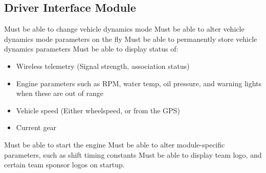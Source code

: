 \subsection{Driver Interface Module}
Must be able to change vehicle dynamics mode
Must be able to alter vehicle dynamics mode parameters on the fly
Must be able to permanently store vehicle dynamics parameters
Must be able to display status of:
\begin{itemize}
  \item Wireless telemetry (Signal strength, association status)
  \item Engine parameters such as RPM, water temp, oil pressure, and warning lights when these are out of range
  \item Vehicle speed (Either wheelspeed, or from the GPS)
  \item Current gear
\end{itemize}
Must be able to start the engine
Must be able to alter module-specific parameters, such as shift timing constants
Must be able to display team logo, and certain team sponsor logos on startup.